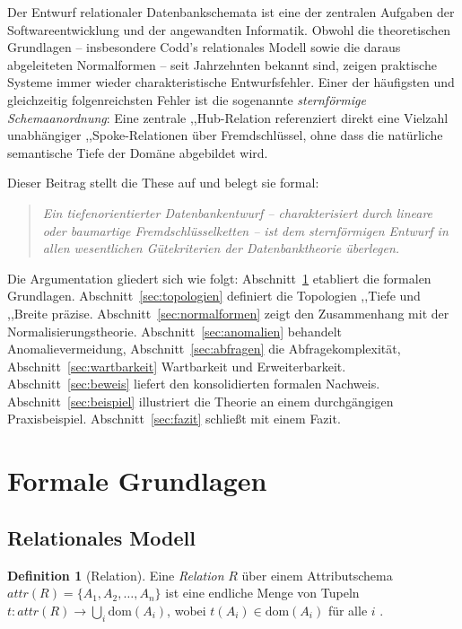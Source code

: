 ﻿\documentclass[12pt,a4paper]{article}
\theoremstyle{definition}
\newtheorem{definition}{Definition}[section]
\theoremstyle{remark}
\newcommand{\att}{\mathit{attr}}
\begin{document}
Der Entwurf relationaler Datenbankschemata ist eine der zentralen Aufgaben der
Softwareentwicklung und der angewandten Informatik. Obwohl die theoretischen
Grundlagen -- insbesondere Codd's relationales Modell \cite{Codd1970} sowie die
daraus abgeleiteten Normalformen \cite{Codd1974, Date2003} -- seit Jahrzehnten
bekannt sind, zeigen praktische Systeme immer wieder charakteristische
Entwurfsfehler. Einer der häufigsten und gleichzeitig folgenreichsten Fehler ist
die sogenannte \emph{sternförmige Schemaanordnung}: Eine zentrale
,,Hub\grqq{}-Relation referenziert direkt eine Vielzahl unabhängiger
,,Spoke\grqq{}-Relationen über Fremdschlüssel, ohne dass die natürliche semantische
Tiefe der Domäne abgebildet wird.

Dieser Beitrag stellt die These auf und belegt sie formal:
\begin{quote}
\emph{Ein tiefenorientierter Datenbankentwurf -- charakterisiert durch lineare
oder baumartige Fremdschlüsselketten -- ist dem sternförmigen Entwurf in allen
wesentlichen Gütekriterien der Datenbanktheorie überlegen.}
\end{quote}

Die Argumentation gliedert sich wie folgt: Abschnitt~\ref{sec:grundlagen}
etabliert die formalen Grundlagen. Abschnitt~\ref{sec:topologien} definiert
die Topologien ,,Tiefe\grqq{} und ,,Breite\grqq{} präzise.
Abschnitt~\ref{sec:normalformen} zeigt den Zusammenhang mit der
Normalisierungstheorie. Abschnitt~\ref{sec:anomalien} behandelt
Anomalievermeidung, Abschnitt~\ref{sec:abfragen} die Abfragekomplexität,
Abschnitt~\ref{sec:wartbarkeit} Wartbarkeit und Erweiterbarkeit.
Abschnitt~\ref{sec:beweis} liefert den konsolidierten formalen Nachweis.
Abschnitt~\ref{sec:beispiel} illustriert die Theorie an einem durchgängigen
Praxisbeispiel. Abschnitt~\ref{sec:fazit} schließt mit einem Fazit.

\section{Formale Grundlagen}
\label{sec:grundlagen}

\subsection{Relationales Modell}

\begin{definition}[Relation]
Eine \emph{Relation} $R$ über einem Attributschema $\att(R) = \{A_1, A_2, \ldots, A_n\}$
ist eine endliche Menge von Tupeln $t: \att(R) \to \bigcup_{i} \mathrm{dom}(A_i)$,
wobei $t(A_i) \in \mathrm{dom}(A_i)$ für alle $i$ \cite{Codd1970}.
\end{definition}
\end{document}
